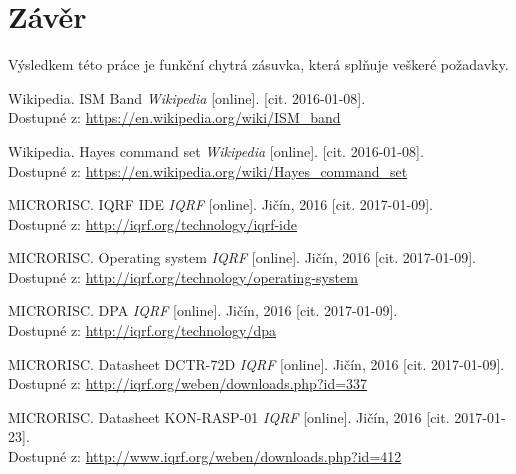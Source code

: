 \documentclass[12pt,a4paper,oneside]{article}
\begin{document}
\newpage

\section*{Závěr}


Výsledkem této práce je funkční chytrá zásuvka, která splňuje veškeré požadavky.

\newpage

\printindex[zkr]


\newpage

\begin{thebibliography}{99}


Wikipedia. ISM Band \emph{Wikipedia} [online]. [cit. 2016-01-08]. \\ Dostupné z: \url{https://en.wikipedia.org/wiki/ISM\_band}

Wikipedia. Hayes command set \emph{Wikipedia} [online]. [cit. 2016-01-08]. \\ Dostupné z: \url{https://en.wikipedia.org/wiki/Hayes\_command\_set}

MICRORISC. IQRF IDE \emph{IQRF} [online]. Jičín, 2016 [cit. 2017-01-09]. \\ Dostupné z: \url{http://iqrf.org/technology/iqrf-ide}

MICRORISC. Operating system \emph{IQRF} [online]. Jičín, 2016 [cit. 2017-01-09]. \\ Dostupné z: \url{http://iqrf.org/technology/operating-system}

MICRORISC. DPA \emph{IQRF} [online]. Jičín, 2016 [cit. 2017-01-09]. \\ Dostupné z: \url{http://iqrf.org/technology/dpa}

MICRORISC. Datasheet DCTR-72D \emph{IQRF} [online]. Jičín, 2016 [cit. 2017-01-09]. \\ Dostupné z: \url{http://iqrf.org/weben/downloads.php?id=337}

MICRORISC. Datasheet KON-RASP-01 \emph{IQRF} [online]. Jičín, 2016 [cit. 2017-01-23]. \\ Dostupné z: \url{http://www.iqrf.org/weben/downloads.php?id=412}


\end{thebibliography}
\end{document}
